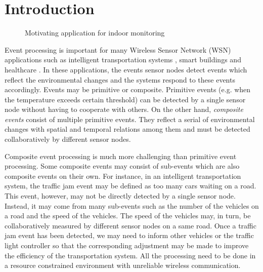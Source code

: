 \section{Introduction}
\label{sec:introduction}

\begin{figure}
\centering
{}
\caption{Motivating application for indoor monitoring}
\label{fig:rooms}
\end{figure}

Event processing is important for many Wireless Sensor Network (WSN) applications such as intelligent transportation systems \cite{klein:its}, smart buildings \cite{lynch:shm} and healthcare \cite{lo:ban}. In these applications, the events sensor nodes detect events which reflect the environmental changes and the systems respond to these events accordingly. Events may be primitive or composite. Primitive events (e.g. when the temperature exceeds certain threshold) can be detected by a single sensor node without having to cooperate with others. On the other hand, \emph{composite events} consist of multiple primitive events. They reflect a serial of environmental changes with spatial and temporal relations among them and must be detected collaboratively by different sensor nodes.

Composite event processing is much more challenging than primitive event processing. Some composite events may consist of sub-events which are also composite events on their own. For instance, in an intelligent transportation system, the traffic jam event may be defined as too many cars waiting on a road. This event, however, may not be directly detected by a single sensor node. Instead, it may come from many sub-events such as the number of the vehicles on a road and the speed of the vehicles. The speed of the vehicles may, in turn, be collaboratively measured by different sensor nodes on a same road. Once a traffic jam event has been detected, we may need to inform other vehicles or the traffic light controller so that the corresponding adjustment may be made to improve the efficiency of the transportation system. All the processing need to be done in a resource constrained environment with unreliable wireless communication.

